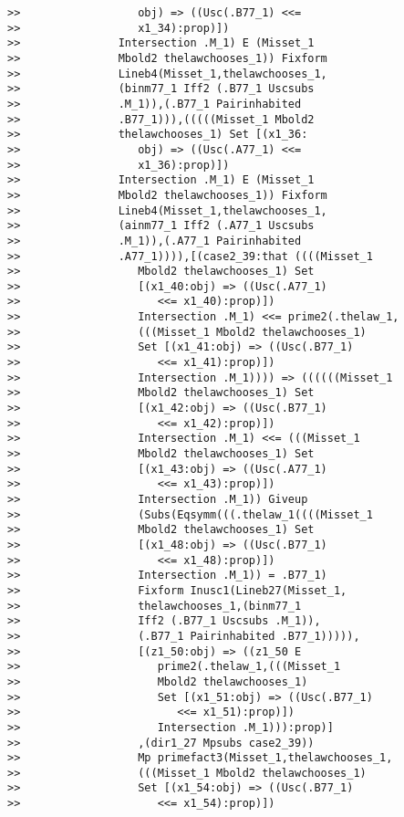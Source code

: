 \documentclass[12pt]{article}
\begin{document}
\begin{verbatim}
>>                  obj) => ((Usc(.B77_1) <<=
>>                  x1_34):prop)])
>>               Intersection .M_1) E (Misset_1
>>               Mbold2 thelawchooses_1)) Fixform
>>               Lineb4(Misset_1,thelawchooses_1,
>>               (binm77_1 Iff2 (.B77_1 Uscsubs
>>               .M_1)),(.B77_1 Pairinhabited
>>               .B77_1))),(((((Misset_1 Mbold2
>>               thelawchooses_1) Set [(x1_36:
>>                  obj) => ((Usc(.A77_1) <<=
>>                  x1_36):prop)])
>>               Intersection .M_1) E (Misset_1
>>               Mbold2 thelawchooses_1)) Fixform
>>               Lineb4(Misset_1,thelawchooses_1,
>>               (ainm77_1 Iff2 (.A77_1 Uscsubs
>>               .M_1)),(.A77_1 Pairinhabited
>>               .A77_1)))),[(case2_39:that ((((Misset_1
>>                  Mbold2 thelawchooses_1) Set
>>                  [(x1_40:obj) => ((Usc(.A77_1)
>>                     <<= x1_40):prop)])
>>                  Intersection .M_1) <<= prime2(.thelaw_1,
>>                  (((Misset_1 Mbold2 thelawchooses_1)
>>                  Set [(x1_41:obj) => ((Usc(.B77_1)
>>                     <<= x1_41):prop)])
>>                  Intersection .M_1)))) => ((((((Misset_1
>>                  Mbold2 thelawchooses_1) Set
>>                  [(x1_42:obj) => ((Usc(.B77_1)
>>                     <<= x1_42):prop)])
>>                  Intersection .M_1) <<= (((Misset_1
>>                  Mbold2 thelawchooses_1) Set
>>                  [(x1_43:obj) => ((Usc(.A77_1)
>>                     <<= x1_43):prop)])
>>                  Intersection .M_1)) Giveup
>>                  (Subs(Eqsymm(((.thelaw_1((((Misset_1
>>                  Mbold2 thelawchooses_1) Set
>>                  [(x1_48:obj) => ((Usc(.B77_1)
>>                     <<= x1_48):prop)])
>>                  Intersection .M_1)) = .B77_1)
>>                  Fixform Inusc1(Lineb27(Misset_1,
>>                  thelawchooses_1,(binm77_1
>>                  Iff2 (.B77_1 Uscsubs .M_1)),
>>                  (.B77_1 Pairinhabited .B77_1))))),
>>                  [(z1_50:obj) => ((z1_50 E
>>                     prime2(.thelaw_1,(((Misset_1
>>                     Mbold2 thelawchooses_1)
>>                     Set [(x1_51:obj) => ((Usc(.B77_1)
>>                        <<= x1_51):prop)])
>>                     Intersection .M_1))):prop)]
>>                  ,(dir1_27 Mpsubs case2_39))
>>                  Mp primefact3(Misset_1,thelawchooses_1,
>>                  (((Misset_1 Mbold2 thelawchooses_1)
>>                  Set [(x1_54:obj) => ((Usc(.B77_1)
>>                     <<= x1_54):prop)])

\end{verbatim}
\end{document}
